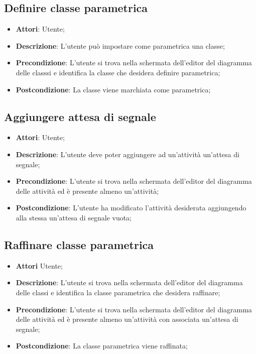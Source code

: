 \documentclass[../AnalisiDeiRequisiti.tex]{subfiles}
\begin{document}
			\subsection{Definire classe parametrica}
			\begin{itemize}
				\item \textbf{Attori}: Utente;
				\item \textbf{Descrizione}: L'utente può impostare come parametrica una classe;
				\item \textbf{Precondizione}: L’utente si trova nella schermata dell’editor del diagramma delle classsi e identifica la classe che desidera definire parametrica;
				\item \textbf{Postcondizione}: La classe viene marchiata come parametrica;
			\end{itemize}
			
			\subsection{Aggiungere attesa di segnale}
			\begin{itemize}
				\item \textbf{Attori}: Utente;
				\item \textbf{Descrizione}: L'utente deve poter aggiungere ad un'attività un'attesa di segnale;
				\item \textbf{Precondizione}: L'utente si trova nella schermata dell'editor del diagramma delle attività ed è presente almeno un'attività;
				\item \textbf{Postcondizione}: L'utente ha modificato l'attività desiderata aggiungendo alla stessa un'attesa di segnale vuota;
			\end{itemize}
			
			\subsection{Raffinare classe parametrica}
			\begin{itemize}
				\item \textbf{Attori} Utente;
				\item \textbf{Descrizione}: L'utente si trova nella schermata dell'editor del diagramma delle classi e identifica la classe parametrica che desidera raffinare;
				\item \textbf{Precondizione}: L'utente si trova nella schermata dell'editor del diagramma delle attività ed è presente almeno un'attività con associata un'attesa di segnale;
				\item \textbf{Postcondizione}: La classe parametrica viene raffinata;
			\end{itemize}
		
\end{document}

